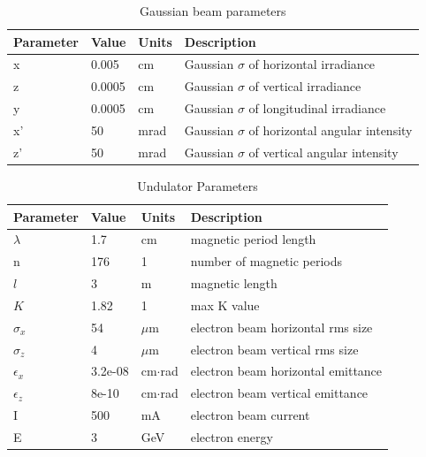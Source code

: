 \documentclass{iucr}
\begin{document}
\begin{table}\label{gaussian_table}
\caption{Gaussian beam parameters}
\begin{tabular}{@{}llll@{}}
Parameter       & Value         & Units     & Description                                           \\
\hline
x               & 0.005         & cm        & Gaussian $\sigma$ of horizontal irradiance            \\
z               & 0.0005        & cm        & Gaussian $\sigma$ of vertical irradiance              \\ 
y               & 0.0005        & cm        & Gaussian $\sigma$ of longitudinal irradiance          \\
x'              & 50            & mrad      & Gaussian $\sigma$ of horizontal angular intensity     \\
z'              & 50            & mrad      & Gaussian $\sigma$ of vertical angular intensity       \\

\end{tabular}
\end{table}

\begin{table}\label{ivubiomax}
\caption{Undulator Parameters}
\begin{tabular}{@{}llll@{}}
Parameter       & Value         & Units     & Description                           \\
\hline
$\lambda$       & 1.7           & cm              & magnetic period length                \\
n               & 176           & 1               & number of magnetic periods            \\ 
$l$             & 3             & m               & magnetic length                       \\
$K$             & 1.82          & 1               & max K value                           \\
$\sigma_x$      & 54            & $\mu$m          & electron beam horizontal rms size     \\
$\sigma_z$      & 4             & $\mu$m          & electron beam vertical rms size       \\
$\epsilon_x$    & 3.2e-08       & cm$\cdot$rad    & electron beam horizontal emittance    \\
$\epsilon_z$    & 8e-10         & cm$\cdot$rad    & electron beam vertical emittance      \\
I               & 500           & mA              & electron beam current                 \\
E               & 3             & GeV             & electron energy                       \\
\end{tabular}
\end{table}
\end{document}
